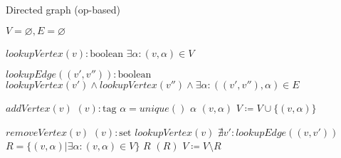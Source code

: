 \begin{algorithm}[t!]
\small{
	\caption{Directed graph (op-based)}
 	\label{alg:graph_op_based}                       

 	\begin{algorithmic}[1]
 	  \State \Payload $V = \varnothing, E = \varnothing$
 	  
 	  \State \Query $lookupVertex(v) : \text{boolean}$
 	  \State \hspace{\algorithmicindent} \Return $\exists \alpha : (v, \alpha) \in V$
 	  
 	  \State \Query $lookupEdge((v', v'')) : \text{boolean}$
 	  \State \hspace{\algorithmicindent} \Return $lookupVertex(v') \land lookupVertex(v'') \land \exists \alpha : ((v', v''), \alpha) \in E$
 	  
 	  \State \Update $addVertex(v)$
 	  \State \hspace{\algorithmicindent} \Prepare $(v) : \text{tag}$
 	  \State \hspace{\algorithmicindent}\hspace{\algorithmicindent} \Let $\alpha = unique()$
 	  \State \hspace{\algorithmicindent}\hspace{\algorithmicindent} \Return $\alpha$
 	  \State \hspace{\algorithmicindent} \Effect $(v, \alpha)$ 
 	  \State \hspace{\algorithmicindent}\hspace{\algorithmicindent} $V \coloneqq V \cup \{(v, \alpha)\}$
 	  
 	  \State \Update $removeVertex(v)$
 	  \State \hspace{\algorithmicindent} \Prepare $(v) : \text{set}$
 	  \State \hspace{\algorithmicindent}\hspace{\algorithmicindent} \Pre $lookupVertex(v)$
 	  \State \hspace{\algorithmicindent}\hspace{\algorithmicindent} \Pre $\nexists v' : lookupEdge((v, v'))$
 	  \State \hspace{\algorithmicindent}\hspace{\algorithmicindent} \Let $R = \{(v, \alpha) | \exists \alpha : (v, \alpha) \in V\}$
 	  \State \hspace{\algorithmicindent}\hspace{\algorithmicindent} \Return $R$
 	  \State \hspace{\algorithmicindent} \Effect $(R)$ 
 	  \State \hspace{\algorithmicindent}\hspace{\algorithmicindent} $V \coloneqq V \setminus R$
 	  

\end{algorithmic}}
\end{algorithm}
